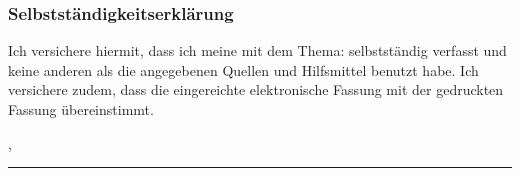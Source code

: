 
\frametitle{Selbstständigkeitserklärung}

Ich versichere hiermit, dass ich meine {\arbeit} mit dem Thema: {\itshape{} \titel{}\/} selbstständig verfasst und keine anderen als die angegebenen Quellen und Hilfsmittel benutzt habe. Ich versichere zudem, dass die eingereichte elektronische Fassung mit der gedruckten Fassung übereinstimmt.

\vspace{3em}

\small{\abgabeort, \datumAbgabe}
\vspace{4em}

\rule{6cm}{0.4pt}\\
\small{\autor}